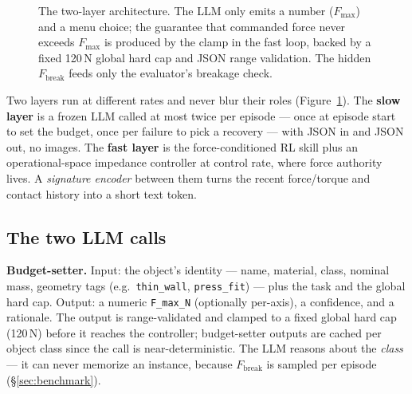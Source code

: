 \documentclass[11pt]{article}
\newcommand{\Fmax}{\ensuremath{F_{\max}}}
\newcommand{\Fbreak}{\ensuremath{F_{\mathrm{break}}}}
\newcommand{\code}[1]{\texttt{\small #1}}
\begin{document}
\begin{figure}[t]
{%
}
\caption{The two-layer architecture. The LLM only emits a number (\Fmax{}) and a menu choice; the guarantee that commanded force never exceeds \Fmax{} is produced by the clamp in the fast loop, backed by a fixed 120\,N global hard cap and JSON range validation. The hidden \Fbreak{} feeds only the evaluator's breakage check.}
\label{fig:arch}
\end{figure}

Two layers run at different rates and never blur their roles (Figure~\ref{fig:arch}). The \textbf{slow layer} is a frozen LLM called at most twice per episode --- once at episode start to set the budget, once per failure to pick a recovery --- with JSON in and JSON out, no images. The \textbf{fast layer} is the force-conditioned RL skill plus an operational-space impedance controller at control rate, where force authority lives. A \emph{signature encoder} between them turns the recent force/torque and contact history into a short text token.

\subsection{The two LLM calls}

\textbf{Budget-setter.} Input: the object's identity --- name, material, class, nominal mass, geometry tags (e.g.\ \code{thin\_wall}, \code{press\_fit}) --- plus the task and the global hard cap. Output: a numeric \code{F\_max\_N} (optionally per-axis), a confidence, and a rationale. The output is range-validated and clamped to a fixed global hard cap (120\,N) before it reaches the controller; budget-setter outputs are cached per object class since the call is near-deterministic. The LLM reasons about the \emph{class} --- it can never memorize an instance, because \Fbreak{} is sampled per episode (\S\ref{sec:benchmark}).
\end{document}
